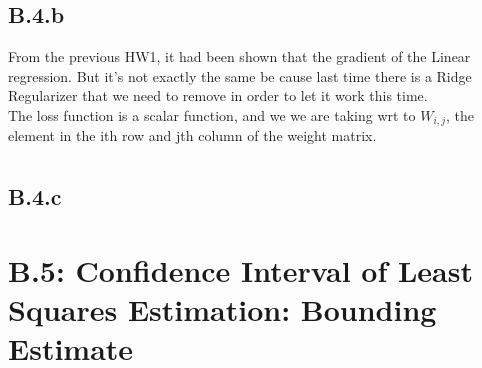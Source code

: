 \documentclass[]{article}
\begin{document}
    \subsection*{B.4.b}
        From the previous HW1, it had been shown that the gradient of the Linear regression. But it's not exactly the same be cause last time there is a Ridge Regularizer that we need to remove in order to let it work this time. 
        \\
        The loss function is a scalar function, and we we are taking wrt to $W_{i, j}$, the element in the ith row and jth column of the weight matrix. 
        \begin{align*}\tag{B.4.b.1}\label{eqn:B.4.b.1}
            
        \end{align*}
    \subsection*{B.4.c}
    
\section*{B.5: Confidence Interval of Least Squares Estimation: Bounding Estimate}
\end{document}

